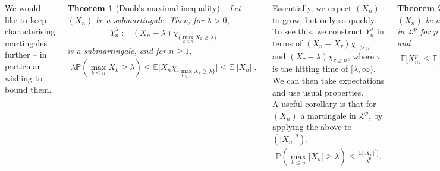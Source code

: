 \documentclass{tikzposter} %
\newcommand\rightopen[2]{\ensuremath{[#1,#2)}}
\newtheorem{theorem}{Theorem}
\begin{document}
\begin{columns}
{    We would like to keep characterising martingales further -- in particular wishing to bound them.
    \begin{theorem}[Doob's maximal inequality]
      \ Let $(X_{n})$ be a submartingale. Then, for $\lambda > 0$,
      \begin{align*}
        Y^{\lambda}_{n} := (X_{n}-\lambda)\chi_{\{\max_{k \le n} X_{k} \ge \lambda\}}
      \end{align*}
      is a submartingale, and for $n \ge 1$,
      \begin{align*}
        \lambda \mathbb{P}\left(\max_{k \le n} X_{k} \ge \lambda\right) \le \mathbb{E}\big[X_{n} \chi_{\{\max_{k \le n} X_{k} \ge \lambda\}}\big] \le \mathbb{E}\big[|X_{n}|\big].
      \end{align*}
    \end{theorem}

    Essentially, we expect $(X_{n})$ to grow, but only so quickly. To see this, we construct $Y^{\lambda}_{n}$ in terms of $(X_{n}-X_{\tau})\chi_{\tau \ge n}$ and $(X_{\tau} - \lambda)\chi_{\tau \ge n}$, where $\tau$ is the hitting time of $\rightopen{\lambda}{\infty}$. We can then take expectations and use usual properties. \\

    A useful corollary is that for $(X_{n})$ a martingale in $\mathcal{L}^{p}$, by applying the above to $(|X_{n}|^{p})$,
    \begin{align*}
      \mathbb{P}\left(\max_{k \le n} |X_{k}| \ge \lambda \right) \le \frac{\mathbb{E}\big[|X_{n}|^{p}\big]}{\lambda^{p}}.
    \end{align*}
    \begin{theorem}[Doob's $L^{p}$ inequality]
      \ Let $(X_{n})$ be a non-negative submartingale in $\mathcal{L}^{p}$ for $p \ge 1$. Then $\displaystyle \max_{k \le n} X_{k} \in \mathcal{L}^{p}$ and
      \begin{align*}
        \mathbb{E}\big[X^{p}_{n}\big] \le \mathbb{E}\left[\max_{k \le n} X_{k}^{p}\right] \le \left(\frac{p}{p-1}\right)^{p}\mathbb{E}\big[X^{p}_{n}\big].
      \end{align*}
    \end{theorem}
    \hphantom{}

    This holds by recalling that for $U,V$ positive random variables, if $u\mathbb{P}(U \ge u) \le \mathbb{E}\big[V \chi_{U \ge u}\big]$, then with $p > 1$, $\mathbb{E}\big[U^{p}\big] \le (p/(p-1))^{p} \mathbb{E}\big[V^{p}\big]$. \\

}
\end{columns}
\end{document}
